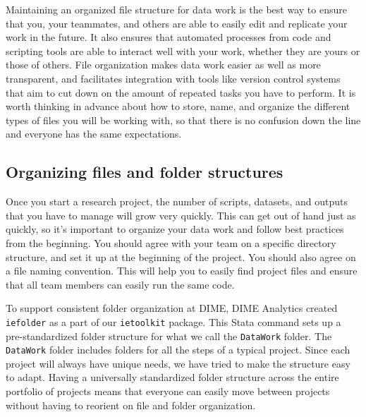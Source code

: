 Maintaining an organized file structure for data work is the best way
to ensure that you, your teammates, and others
are able to easily edit and replicate your work in the future.
It also ensures that automated processes from code and scripting tools
are able to interact well with your work,
whether they are yours or those of others.
File organization makes data work easier as well as more transparent,
and facilitates integration with tools like version control systems
that aim to cut down on the amount of repeated tasks you have to perform.
It is worth thinking in advance about how to store, name, and organize
the different types of files you will be working with,
so that there is no confusion down the line
and everyone has the same expectations.

\subsection{Organizing files and folder structures}

Once you start a research project,
the number of scripts, datasets, and outputs
that you have to manage will grow very quickly.
This can get out of hand just as quickly,
so it's important to organize your data work
and follow best practices from the beginning.
You should agree with your team on a specific directory structure,
and set it up at the beginning of the project.
You should also agree on a file naming convention.
This will help you to easily find project files and
ensure that all team members can easily run the same code.

To support consistent folder organization at DIME,
DIME Analytics created \texttt{iefolder}
as a part of our \texttt{ietoolkit} package.
This Stata command sets up a pre-standardized folder structure
for what we call the \texttt{DataWork} folder.
The \texttt{DataWork} folder includes folders for all the steps of a typical project.
Since each project will always have unique needs,
we have tried to make the structure easy to adapt.
Having a universally standardized folder structure
across the entire portfolio of projects
means that everyone can easily move between projects
without having to reorient on file and folder organization.

